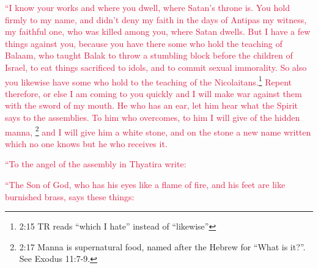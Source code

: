 \myverse{}\textcolor{crimson}{“I know your works and where you dwell, where Satan’s throne
	is. You hold firmly to my name, and didn’t deny my faith in the days of Antipas my witness, my faithful
	one, who was killed among you, where Satan dwells.
}
\myverse{}\textcolor{crimson}{But I have a few things against you, because you have there some who hold
	the teaching of Balaam, who taught Balak to throw a stumbling block before the children of Israel, to
	eat things sacrificed to idols, and to commit sexual immorality.
}
\myverse{}\textcolor{crimson}{So also you likewise have some who hold to the teaching of the Nicolaitans.}\footnote{2:15 TR reads “which I hate” instead of “likewise”}
\myverse{}\textcolor{crimson}{Repent therefore, or else I am coming to you quickly and I will make war
	against them with the sword of my mouth.
}
\myverse{}\textcolor{crimson}{He who has an ear, let him hear what the Spirit says to the assemblies.
	To him who overcomes, to him I will give of the hidden manna,
}\footnote{2:17 Manna is supernatural food, named after the Hebrew for “What is it?”. See
	Exodus 11:7-9.}
\textcolor{crimson}{and I will give him a white stone, and on the stone a new name written which no one knows but he who
	receives it.}

\myverse{}\textcolor{crimson}{“To the angel of the assembly in Thyatira write:}

\textcolor{crimson}{“The Son of God, who has his eyes like a flame of fire, and his feet are like burnished
	brass, says these things:}

